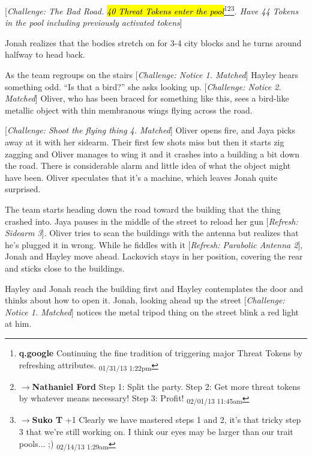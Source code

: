 {[}\textit{Challenge: The Bad Road.  }\textit{\hl{40 Threat Tokens enter the pool}}\footnote{\textbf{q.google }Continuing the fine tradition of triggering major Threat Tokens by refreshing attributes. \textsubscript{01/31/13 1:22pm}}\footnote{$\rightarrow$\textbf{Nathaniel Ford }Step 1: Split the party. Step 2: Get more threat tokens by whatever means necessary! Step 3: Profit! \textsubscript{02/01/13 11:45am}}\footnote{$\rightarrow$\textbf{Suko T }+1
Clearly we have mastered steps 1 and 2, it's that tricky step 3 that we're still working on.  I think our eyes may be larger than our trait pools... ;) \textsubscript{02/14/13 1:29am}}\textit{.  Have 44 Tokens in the pool including previously activated tokens}{]}



Jonah realizes that the bodies stretch on for 3-4 city blocks and he turns around halfway to head back.



As the team regroups on the stairs {[}\textit{Challenge: Notice 1. Matched}{]} Hayley hears something odd.  ``Is that a bird?'' she asks looking up.  {[}\textit{Challenge: Notice 2. Matched}{]} Oliver, who has been braced for something like this, sees a bird-like metallic object with thin membranous wings flying across the road.



{[}\textit{Challenge: Shoot the flying thing 4.  Matched}{]}  Oliver opens fire, and Jaya picks away at it with her sidearm.  Their first few shots miss but then it starts zig zagging and Oliver manages to wing it and it crashes into a building a bit down the road.  There is considerable alarm and little idea of what the object might have been.  Oliver speculates that it's a machine, which leaves Jonah quite surprised.



The team starts heading down the road toward the building that the thing crashed into.  Jaya pauses in the middle of the street to reload her gun {[}\textit{Refresh: Sidearm 3}{]}.  Oliver tries to scan the buildings with the antenna but realizes that he's plugged it in wrong.  While he fiddles with it {[}\textit{Refresh: Parabolic Antenna 2}{]}, Jonah and Hayley move ahead.  Lackovich stays in her position, covering the rear and sticks close to the buildings.



Hayley and Jonah reach the building first and Hayley contemplates the door and thinks about how to open it.  Jonah, looking ahead up the street {[}\textit{Challenge: Notice 1. Matched}{]} notices the metal tripod thing on the street blink a red light at him.



